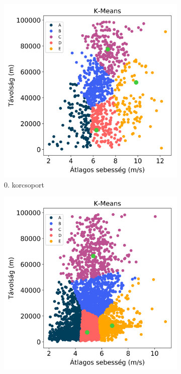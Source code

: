 \begin{figure}[!h]
	\centering
	\begin{subfigure}{.5\linewidth}
		\centering
		\includegraphics[width=\textwidth,keepaspectratio]{kepek/clustering/age_group_0_training_suggestions.png}
		\caption{ 0. korcsoport}
		\label{subfig:ageNullTraining}
	\end{subfigure}%
	\begin{subfigure}{.5\linewidth}
		\centering
		\includegraphics[width=\textwidth,keepaspectratio]{kepek/clustering/age_group_1_training_suggestions.png}

\end{subfigure}
\end{figure}
